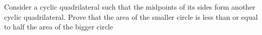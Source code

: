 Consider a cyclic quadrilateral such that the midpoints of its sides form another cyclic quadrilateral. Prove that the area of the smaller circle is less than or equal to half the area of the bigger circle